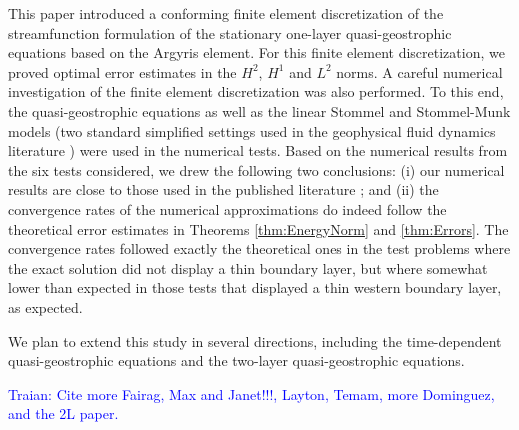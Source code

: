 This paper introduced a conforming finite element discretization of the streamfunction formulation of the stationary one-layer quasi-geostrophic equations based on the Argyris element. 
For this finite element discretization, we proved optimal error estimates in the $H^2$, $H^1$ and $L^2$ norms.
A careful numerical investigation of the finite element discretization was also performed.
To this end, the quasi-geostrophic equations as well as the linear Stommel and Stommel-Munk models (two standard simplified settings used in the geophysical fluid dynamics literature \cite{Vallis06,Myers,Cascon}) were used in the numerical tests.
Based on the numerical results from the six tests considered, we drew the following two conclusions: (i) our numerical results are close to those used in the published literature \cite{Vallis06,Myers,Cascon}; and (ii) the convergence rates of the numerical approximations do indeed follow the theoretical error estimates in Theorems \ref{thm:EnergyNorm} and \ref{thm:Errors}.
The convergence rates followed exactly the theoretical ones in the test problems where the exact solution did not display a thin boundary layer, but where somewhat lower than expected in those tests that displayed a thin western boundary layer, as expected.

We plan to extend this study in several directions, including the time-dependent quasi-geostrophic equations and the two-layer quasi-geostrophic equations.

\textcolor{blue}{Traian: Cite more Fairag, Max and Janet!!!, Layton, Temam, more Dominguez, and the 2L paper.}

